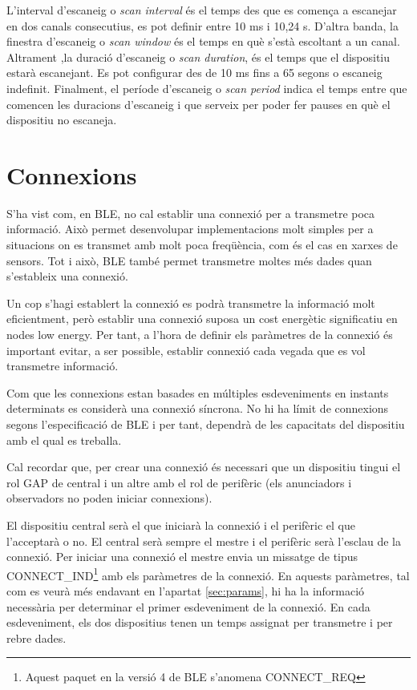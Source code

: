 L'interval d'escaneig o \textit{scan interval} és el temps des que es comença a escanejar en dos canals consecutius, es pot definir entre 10 ms i 10,24 s.
D'altra banda, la finestra d'escaneig o \textit{scan window} és el temps en què s'està escoltant a un canal.
Altrament ,la duració d'escaneig o \textit{scan duration}, és el temps que el dispositiu estarà escanejant.
Es pot configurar des de 10 ms fins a 65 segons o escaneig indefinit.
Finalment, el període d'escaneig o \textit{scan period} indica el temps entre que comencen les duracions d'escaneig i que serveix per poder fer pauses en què el dispositiu no escaneja.


\section{Connexions}
S'ha vist com, en BLE, no cal establir una connexió per a transmetre poca informació.
Això permet desenvolupar implementacions molt simples per a situacions on es transmet amb molt poca freqüència, com és el cas en xarxes de sensors.
Tot i això, BLE també permet transmetre moltes més dades quan s'estableix una connexió.

Un cop s'hagi establert la connexió es podrà transmetre la informació molt eficientment, però establir una connexió suposa un cost energètic significatiu en nodes low energy.
Per tant, a l'hora de definir els paràmetres de la connexió és important evitar, a ser possible, establir connexió cada vegada que es vol transmetre informació.

Com que les connexions estan basades en múltiples esdeveniments en instants determinats es considerà una connexió síncrona.
No hi ha límit de connexions segons l'especificació de BLE i per tant, dependrà de les capacitats del dispositiu amb el qual es treballa.

Cal recordar que, per crear una connexió és necessari que un dispositiu tingui el rol GAP de central i un altre amb el rol de perifèric (els anunciadors i observadors no poden iniciar connexions).

El dispositiu central serà el que iniciarà la connexió i el perifèric el que l'acceptarà o no.
El central serà sempre el mestre i el perifèric serà l'esclau de la connexió.
Per iniciar una connexió el mestre envia un missatge de tipus CONNECT\_IND\footnote{Aquest paquet en la versió 4 de BLE s'anomena CONNECT\_REQ} amb els paràmetres de la connexió.
En aquests paràmetres, tal com es veurà més endavant en l'apartat \ref{sec:params}, hi ha la informació necessària per determinar el primer esdeveniment de la connexió.
En cada esdeveniment, els dos dispositius tenen un temps assignat per transmetre i per rebre dades.

